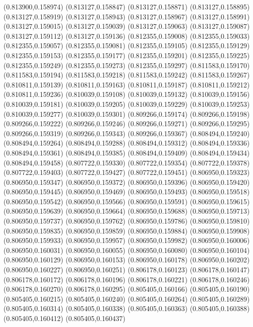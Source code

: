 (0.813900,0.158974)
(0.813127,0.158847)
(0.813127,0.158871)
(0.813127,0.158895)
(0.813127,0.158919)
(0.813127,0.158943)
(0.813127,0.158967)
(0.813127,0.158991)
(0.813127,0.159015)
(0.813127,0.159039)
(0.813127,0.159063)
(0.813127,0.159087)
(0.813127,0.159112)
(0.813127,0.159136)
(0.812355,0.159008)
(0.812355,0.159033)
(0.812355,0.159057)
(0.812355,0.159081)
(0.812355,0.159105)
(0.812355,0.159129)
(0.812355,0.159153)
(0.812355,0.159177)
(0.812355,0.159201)
(0.812355,0.159225)
(0.812355,0.159249)
(0.812355,0.159273)
(0.812355,0.159297)
(0.811583,0.159170)
(0.811583,0.159194)
(0.811583,0.159218)
(0.811583,0.159242)
(0.811583,0.159267)
(0.810811,0.159139)
(0.810811,0.159163)
(0.810811,0.159187)
(0.810811,0.159212)
(0.810811,0.159236)
(0.810039,0.159108)
(0.810039,0.159132)
(0.810039,0.159156)
(0.810039,0.159181)
(0.810039,0.159205)
(0.810039,0.159229)
(0.810039,0.159253)
(0.810039,0.159277)
(0.810039,0.159301)
(0.809266,0.159174)
(0.809266,0.159198)
(0.809266,0.159222)
(0.809266,0.159246)
(0.809266,0.159271)
(0.809266,0.159295)
(0.809266,0.159319)
(0.809266,0.159343)
(0.809266,0.159367)
(0.808494,0.159240)
(0.808494,0.159264)
(0.808494,0.159288)
(0.808494,0.159312)
(0.808494,0.159336)
(0.808494,0.159361)
(0.808494,0.159385)
(0.808494,0.159409)
(0.808494,0.159434)
(0.808494,0.159458)
(0.807722,0.159330)
(0.807722,0.159354)
(0.807722,0.159378)
(0.807722,0.159403)
(0.807722,0.159427)
(0.807722,0.159451)
(0.806950,0.159323)
(0.806950,0.159347)
(0.806950,0.159372)
(0.806950,0.159396)
(0.806950,0.159420)
(0.806950,0.159445)
(0.806950,0.159469)
(0.806950,0.159493)
(0.806950,0.159518)
(0.806950,0.159542)
(0.806950,0.159566)
(0.806950,0.159591)
(0.806950,0.159615)
(0.806950,0.159639)
(0.806950,0.159664)
(0.806950,0.159688)
(0.806950,0.159713)
(0.806950,0.159737)
(0.806950,0.159762)
(0.806950,0.159786)
(0.806950,0.159810)
(0.806950,0.159835)
(0.806950,0.159859)
(0.806950,0.159884)
(0.806950,0.159908)
(0.806950,0.159933)
(0.806950,0.159957)
(0.806950,0.159982)
(0.806950,0.160006)
(0.806950,0.160031)
(0.806950,0.160055)
(0.806950,0.160080)
(0.806950,0.160104)
(0.806950,0.160129)
(0.806950,0.160153)
(0.806950,0.160178)
(0.806950,0.160202)
(0.806950,0.160227)
(0.806950,0.160251)
(0.806178,0.160123)
(0.806178,0.160147)
(0.806178,0.160172)
(0.806178,0.160196)
(0.806178,0.160221)
(0.806178,0.160246)
(0.806178,0.160270)
(0.806178,0.160295)
(0.805405,0.160166)
(0.805405,0.160190)
(0.805405,0.160215)
(0.805405,0.160240)
(0.805405,0.160264)
(0.805405,0.160289)
(0.805405,0.160314)
(0.805405,0.160338)
(0.805405,0.160363)
(0.805405,0.160388)
(0.805405,0.160412)
(0.805405,0.160437)
